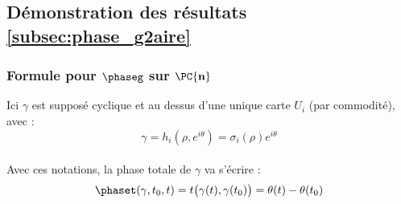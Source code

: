 
\subsection{Démonstration des résultats \cref{subsec:phase_g2aire}} \label{ann:stokes}

\subsubsection{Formule pour $\bf{\phaseg}$ sur $\bf{\PC{n}}$} \label{ann:proj2phaseg}

Ici $\gamma$ est supposé cyclique et au dessus d'une unique carte $U_i$ (par commodité), avec :
\[\gamma = h_i(\rho, e^{i\theta}) = \sigma_i(\rho) e^{i\theta}\]
\\
Avec ces notations, la phase totale de $\gamma$ va s'écrire :
\[\phaset(\gamma, t_0, t) = t\big( \gamma(t), \gamma(t_0) \big) = \theta(t) - \theta(t_0)\]
\\

